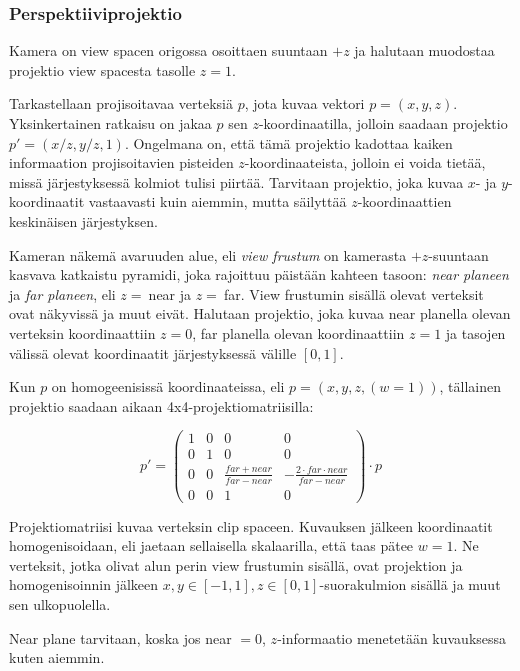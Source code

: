 \documentclass[12pt] {article}
\begin{document}
\subsubsection {Perspektiiviprojektio}

Kamera on view spacen origossa osoittaen suuntaan $+z$ ja halutaan muodostaa projektio view spacesta tasolle $z = 1$. 

Tarkastellaan projisoitavaa verteksiä $p$, jota kuvaa vektori $p = (x, y, z)$. Yksinkertainen ratkaisu on jakaa $p$ sen $z$-koordinaatilla, jolloin saadaan projektio $p' = (x/z, y/z, 1)$. Ongelmana on, että tämä projektio kadottaa kaiken informaation projisoitavien pisteiden $z$-koordinaateista, jolloin ei voida tietää, missä järjestyksessä kolmiot tulisi piirtää. Tarvitaan projektio, joka kuvaa $x$- ja $y$-koordinaatit vastaavasti kuin aiemmin, mutta säilyttää $z$-koordinaattien keskinäisen järjestyksen.

Kameran näkemä avaruuden alue, eli \textit{view frustum} on kamerasta $+z$-suuntaan kasvava katkaistu pyramidi, joka rajoittuu päistään kahteen tasoon: \textit{near planeen} ja \textit{far planeen}, eli $z =\ $near ja $z =\ $far. View frustumin sisällä olevat verteksit ovat näkyvissä ja muut eivät. Halutaan projektio, joka kuvaa near planella olevan verteksin koordinaattiin $z = 0$, far planella olevan koordinaattiin $z = 1$ ja tasojen välissä olevat koordinaatit järjestyksessä välille $[0, 1]$.

Kun $p$ on homogeenisissä koordinaateissa, eli $p = (x, y, z, (w = 1))$, tällainen projektio saadaan aikaan 4x4-projektiomatriisilla:

\[
	p' = \begin{pmatrix}
	1 & 0 & 0 & 0 \\
	0 & 1 & 0 & 0 \\
	0 & 0 & \frac{far+near}{far-near} & -\frac{2 \cdot far \cdot near}{far-near} \\
	0 & 0 & 1 & 0
	\end{pmatrix} \cdot p
\]

Projektiomatriisi kuvaa verteksin clip spaceen. Kuvauksen jälkeen koordinaatit homogenisoidaan, eli jaetaan sellaisella skalaarilla, että taas pätee $w = 1$. Ne verteksit, jotka olivat alun perin view frustumin sisällä, ovat projektion ja homogenisoinnin jälkeen $x, y \in [-1, 1], z \in [0, 1]$-suorakulmion sisällä ja muut sen ulkopuolella.

Near plane tarvitaan, koska jos near $= 0$, $z$-informaatio menetetään kuvauksessa kuten aiemmin.
\end{document}
